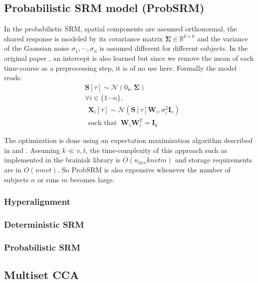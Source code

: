 \documentclass{report}
\begin{document}
\subsection{Probabilistic SRM model (ProbSRM)}
In the probabilistic SRM, spatial components are assumed orthonormal, the shared response is modeled by its covariance matrix $\mathbf{\Sigma} \in \mathbb{R}^{k \times k}$ and the variance of the Gaussian noise $\sigma_1, \cdots , \sigma_n$ is assumed different for different subjects.
%
In the original paper \cite{chen2015reduced}, an intercept is also learned but since we remove the mean of each time-course as a preprocessing step, it is of no use here.
%
Formally the model reads:
\begin{align*}
&\mathbf{S}[\tau] \sim \mathcal{N} (0_k, \mathbf{\Sigma}) \\
& \forall i \in \{1 \cdots n\}, \\
& \ \ \mathbf{X}_i[\tau] \sim \mathcal{N} (\mathbf{S}[\tau]\mathbf{W}_i, \sigma_i^2 \mathbf{I}_v) \\
& \ \ \text{such that }  \  \mathbf{W}_i\mathbf{W}_i^T = \mathbf{I}_k
\end{align*}

The optimization is done using an expectation maximization algorithm described in \cite{anderson2016enabling} and \cite{chen2015reduced}. Assuming $k \ll v, t$, the time-complexity of this approach such as implemented in the brainiak library is $O(n_{iter} k nv tm)$ and storage requirements are in $O(nmvt)$. So ProbSRM is also expensive whenever the number of subjects $n$ or runs $m$ becomes large.

\subsubsection{Hyperalignment}
\subsubsection{Deterministic SRM}
\subsubsection{Probabilistic SRM}
\subsection{Multiset CCA}


\end{document}
